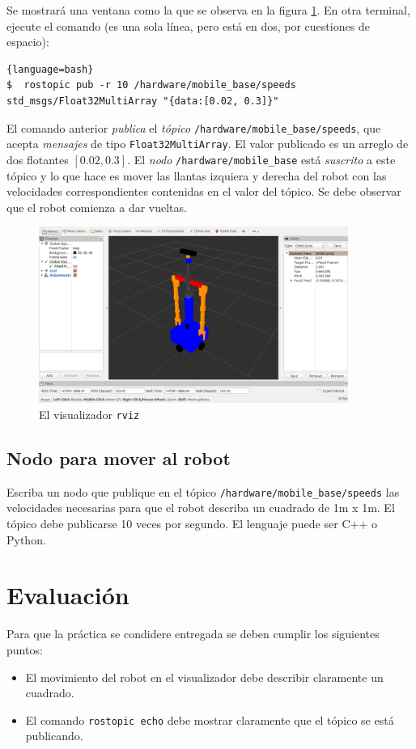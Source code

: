\documentclass[letterpaper,12pt]{article}
\begin{document}
Se mostrará una ventana como la que se observa en la figura \ref{fig:rviz}. En otra terminal, ejecute el comando (es una sola línea, pero está en dos, por cuestiones de espacio):
\begin{lstlisting}{language=bash}
$  rostopic pub -r 10 /hardware/mobile_base/speeds std_msgs/Float32MultiArray "{data:[0.02, 0.3]}"
\end{lstlisting}

El comando anterior \textit{publica} el \textit{tópico} \texttt{/hardware/mobile\_base/speeds}, que acepta \textit{mensajes} de tipo \texttt{Float32MultiArray}. El valor publicado es un arreglo de dos flotantes $[0.02, 0.3]$. El \textit{nodo} \texttt{/hardware/mobile\_base} está \textit{suscrito} a este tópico y lo que hace es mover las llantas izquiera y derecha del robot con las velocidades correspondientes contenidas en el valor del tópico. Se debe observar que el robot comienza a dar vueltas. 

\begin{figure}
\centering
\includegraphics[width=0.9\textwidth]{rviz_initial.png}
\caption{El visualizador \texttt{rviz}}
\label{fig:rviz}
\end{figure}

\subsection{Nodo para mover al robot}
Escriba un nodo que publique en el tópico \texttt{/hardware/mobile\_base/speeds} las velocidades necesarias para que el robot describa un cuadrado de 1m x 1m. El tópico debe publicarse 10 veces por segundo. El lenguaje puede ser C++ o Python.

\section{Evaluación}
Para que la práctica se condidere entregada se deben cumplir los siguientes puntos:
\begin{itemize}
\item El movimiento del robot en el visualizador debe describir claramente un cuadrado.
\item El comando \texttt{rostopic echo} debe mostrar claramente que el tópico se está publicando.
\end{itemize}
\end{document}
